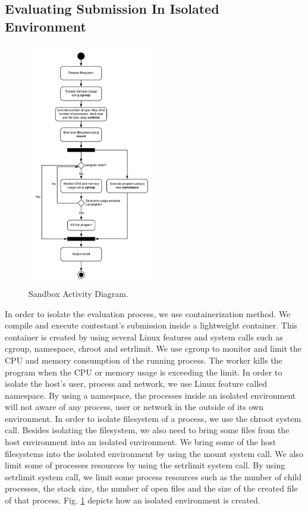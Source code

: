 \documentclass[conference,a4paper]{IEEEtran}
\begin{document}
\subsection{Evaluating Submission In Isolated Environment}

\begin{figure}[htbp]
\centerline{\includegraphics[width=0.5\textwidth]{images/paper-sandbox-activity.jpeg}}
\caption{Sandbox Activity Diagram.}
\label{paper-sandbox-activity}
\end{figure}

In order to isolate the evaluation process, we use containerization method. We compile and execute contestant's submission inside a lightweight container. This container is created by using several Linux features and system calls such as cgroup, namespace, chroot and setrlimit. We use cgroup to monitor and limit the CPU and memory consumption of the running process. The worker kills the program when the CPU or memory usage is exceeding the limit. In order to isolate the host's user, process and network, we use Linux feature called namespace. By using a namespace, the processes inside an isolated environment will not aware of any process, user or network in the outside of its own environment. In order to isolate filesystem of a process, we use the chroot system call. Besides isolating the filesystem, we also need to bring some files from the host environment into an isolated environment. We bring some of the host filesystems into the isolated environment by using the mount system call. We also limit some of processes resources by using the setrlimit system call. By using setrlimit system call, we limit some process resources such as the number of child processes, the stack size, the number of open files and the size of the created file of that process. Fig. \ref{paper-sandbox-activity} depicts how an isolated environment is created.
\end{document}
